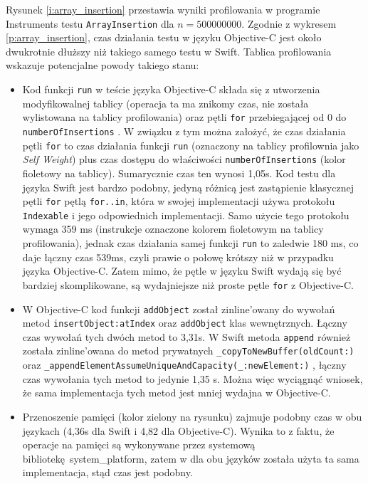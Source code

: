 \documentclass[mgr, shortabstract]{iithesis}
\newcommand{\swiftinline}[1]{
    \texttt{#1}
}
\newcommand{\objcinline}[1]{
    \texttt{#1}
}
\begin{document}
Rysunek \ref{i:array_insertion} przestawia wyniki profilowania w programie Instruments testu \texttt{ArrayInsertion} dla $n = 500000000$. Zgodnie z wykresem \ref{p:array_insertion}, czas działania testu w języku Objective-C jest około dwukrotnie dłuższy niż takiego samego testu w Swift. Tablica profilowania wskazuje potencjalne powody takiego stanu:

\begin{itemize}
    \item Kod funkcji \objcinline{run} w teście języka Objective-C składa się z utworzenia modyfikowalnej tablicy (operacja ta ma znikomy czas, nie została wylistowana na tablicy profilowania) oraz pętli \texttt{for} przebiegającej od 0 do \objcinline{numberOfInsertions}. W związku z tym można założyć, że czas działania pętli \texttt{for} to czas działania funkcji \objcinline{run} (oznaczony na tablicy profilownia jako \textit{Self Weight}) plus czas dostępu do właściwości \objcinline{numberOfInsertions} (kolor fioletowy na tablicy). Sumarycznie czas ten wynosi 1,05s. Kod testu dla języka Swift jest bardzo podobny, jedyną różnicą jest zastąpienie klasycznej pętli \texttt{for} pętlą \texttt{for..in}, która w swojej implementacji używa protokołu \swiftinline{Indexable} i jego odpowiednich implementacji. Samo użycie tego protokołu wymaga 359 ms (instrukcje oznaczone kolorem fioletowym na tablicy profilowania), jednak czas działania samej funkcji \swiftinline{run} to zaledwie 180 ms, co daje łączny czas 539ms, czyli prawie o połowę krótszy niż w przypadku języka Objective-C. Zatem mimo, że pętle w języku Swift wydają się być bardziej skomplikowane, są wydajniejsze niż proste pętle \texttt{for} z Objective-C.
    \item W Objective-C kod funkcji \objcinline{addObject} został zinline'owany do wywołań metod \objcinline{insertObject:atIndex} oraz \objcinline{addObject} klas wewnętrznych. Łączny czas wywołań tych dwóch metod to 3,31s. W Swift metoda \swiftinline{append} również została zinline'owana do metod prywatnych \swiftinline{_copyToNewBuffer(oldCount:)} oraz \swiftinline{_appendElementAssumeUniqueAndCapacity(_:newElement:)}, łączny czas wywołania tych metod to jedynie 1,35 s. Można więc wyciągnąć wniosek, że sama implementacja tych metod jest mniej wydajna w Objective-C.
    \item Przenoszenie pamięci (kolor zielony na rysunku) zajmuje podobny czas w obu językach (4,36s dla Swift i 4,82 dla Objective-C). Wynika to z faktu, że operacje na pamięci są wykonywane przez systemową bibliotekę \textsf{system\_platform}, zatem w dla obu języków została użyta ta sama implementacja, stąd czas jest podobny.

\end{itemize}
\end{document}
